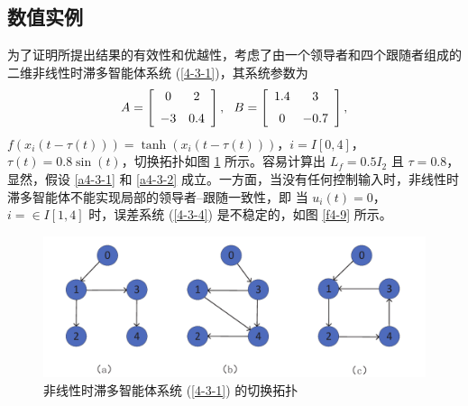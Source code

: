 \subsection{数值实例} 
为了证明所提出结果的有效性和优越性，考虑了由一个领导者和四个跟随者组成的二维非线性时滞多智能体系统 (\ref{4-3-1})，其系统参数为 
\begin{align*} 
A=\left[ \begin{array}{cc}
0& 2\vspace{0.2cm}\\
-3&0.4 
\end{array}
\right],~~
B=\left[ \begin{array}{cc}
1.4&3\vspace{0.2cm}\\
0&-0.7
\end{array}\right],
\end{align*}
$f(x_i(t-\tau(t)))=\tanh(x_i(t-\tau(t)) )$，$i=I [0,4]$，$\tau(t)=0.8\sin(t)$，切换拓扑如图 \ref{f4-8} 所示。容易计算出 $L_f=0.5I_2$ 且 $\tau=0.8$，显然，假设 \ref{a4-3-1} 和 \ref{a4-3-2} 成立。一方面，当没有任何控制输入时，非线性时滞多智能体不能实现局部的领导者--跟随一致性，即 当 $u_i(t)=0$，$i=\in I [1,4]$ 时，误差系统 (\ref{4-3-4}) 是不稳定的，如图 \ref{f4-9} 所示。
\begin{figure}[!tp]
    \centering
    \includegraphics[scale=0.8]{./ch4/fig4-8.pdf}
    \caption{ 非线性时滞多智能体系统 (\ref{4-3-1}) 的切换拓扑   }
    \label{f4-8}
\end{figure}   
